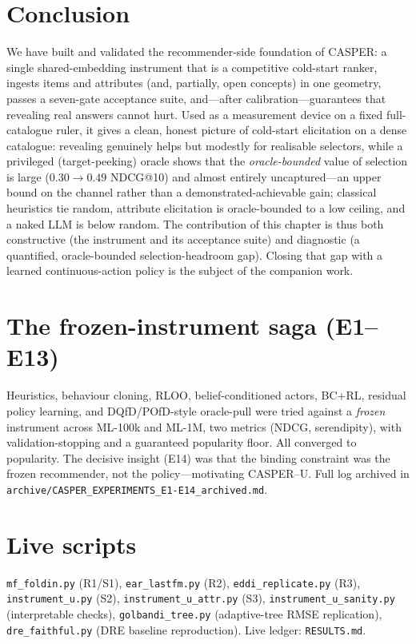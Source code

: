 \documentclass[11pt]{article}
\begin{document}
\section{Conclusion}\label{sec:conc}
We have built and validated the recommender-side foundation of CASPER: a single shared-embedding instrument that is a
competitive cold-start ranker, ingests items and attributes (and, partially, open concepts) in one geometry, passes a
seven-gate acceptance suite, and---after calibration---guarantees that revealing real answers cannot hurt. Used as
a measurement device on a fixed full-catalogue ruler, it gives a clean, honest picture of cold-start elicitation on a
dense catalogue:
revealing genuinely helps but modestly for realisable selectors, while a privileged (target-peeking) oracle shows that
the \emph{oracle-bounded} value of selection is large ($0.30\!\to\!0.49$ NDCG@10) and almost entirely uncaptured---an
upper bound on the channel rather than a demonstrated-achievable gain; classical heuristics tie
random, attribute elicitation is oracle-bounded to a low ceiling, and a naked LLM is below random. The contribution of
this chapter is thus both constructive (the instrument and its acceptance suite) and diagnostic (a quantified,
oracle-bounded selection-headroom gap). Closing that gap with a learned continuous-action policy is the subject of the
companion work.

\appendix
\section{The frozen-instrument saga (E1--E13)}\label{app:saga}
Heuristics, behaviour cloning, RLOO, belief-conditioned actors, BC$+$RL, residual policy learning, and
DQfD/POfD-style oracle-pull were tried against a \emph{frozen} instrument across ML-100k and ML-1M, two metrics
(NDCG, serendipity), with validation-stopping and a guaranteed popularity floor. All converged to popularity. The
decisive insight (E14) was that the binding constraint was the frozen recommender, not the policy---motivating
CASPER--U. Full log archived in \texttt{archive/CASPER\_EXPERIMENTS\_E1-E14\_archived.md}.

\section{Live scripts}\label{app:scripts}
\texttt{mf\_foldin.py} (R1/S1), \texttt{ear\_lastfm.py} (R2), \texttt{eddi\_replicate.py} (R3),
\texttt{instrument\_u.py} (S2), \texttt{instrument\_u\_attr.py} (S3), \texttt{instrument\_u\_sanity.py}
(interpretable checks), \texttt{golbandi\_tree.py} (adaptive-tree RMSE replication), \texttt{dre\_faithful.py}
(DRE baseline reproduction). Live ledger: \texttt{RESULTS.md}.
\end{document}
